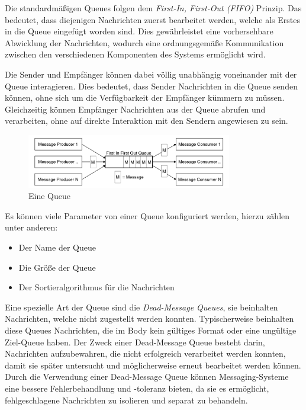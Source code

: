 Die standardmäßigen Queues folgen dem \emph{First-In, First-Out (FIFO)} Prinzip. Das bedeutet, dass diejenigen Nachrichten zuerst bearbeitet werden, welche als Erstes in die Queue eingefügt worden sind. Dies gewährleistet eine vorhersehbare Abwicklung der Nachrichten, wodurch eine ordnungsgemäße Kommunikation zwischen den verschiedenen Komponenten des Systems ermöglicht wird. \cite{curryMessageOrientedMiddleware2004}

Die Sender und Empfänger können dabei völlig unabhängig voneinander mit der Queue interagieren. Dies bedeutet, dass Sender Nachrichten in die Queue senden können, ohne sich um die Verfügbarkeit der Empfänger kümmern zu müssen. Gleichzeitig können Empfänger Nachrichten aus der Queue abrufen und verarbeiten, ohne auf direkte Interaktion mit den Sendern angewiesen zu sein. \cite{curryMessageOrientedMiddleware2004}

\begin{figure}
    \centering
    \includegraphics[width=0.8\textwidth]{content/img/Research/Message_Services/messagingQueueMOM.png}
    \caption{Eine Queue  \cite{curryMessageOrientedMiddleware2004}}
    \label{fig:messagingQueueMOM}
\end{figure}
\FloatBarrier

Es können viele Parameter von einer Queue konfiguriert werden, hierzu zählen unter anderen:

\begin{itemize}
	\item Der Name der Queue
	\item Die Größe der Queue
	\item Der Sortieralgorithmus für die Nachrichten
\end{itemize}

Eine spezielle Art der Queue sind die \emph{Dead-Message Queues}, sie beinhalten Nachrichten, welche nicht zugestellt werden konnten. 
Typischerweise beinhalten diese Queues Nachrichten, die im Body kein gültiges Format oder eine ungültige Ziel-Queue haben. Der Zweck einer Dead-Message Queue besteht darin, Nachrichten aufzubewahren, die nicht erfolgreich verarbeitet werden konnten, damit sie später untersucht und möglicherweise erneut bearbeitet werden können. 
Durch die Verwendung einer Dead-Message Queue können Messaging-Systeme eine bessere Fehlerbehandlung und -toleranz bieten, da sie es ermöglicht, fehlgeschlagene Nachrichten zu isolieren und separat zu behandeln.
\cite{curryMessageOrientedMiddleware2004}

